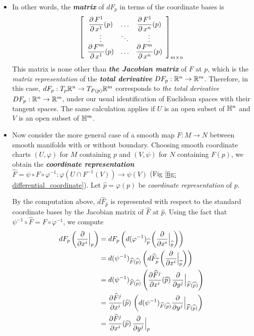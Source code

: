 \documentclass[11pt]{article}
\begin{document}
\begin{itemize}
\item In other words, the \emph{\textbf{matrix}} of $dF_p$ in terms of the coordinate bases is 
\begin{align}
\left[\begin{array}{ccc}
\dfrac{\partial\,F^{1}}{\partial\,x^{1}}(p)& \ldots& \dfrac{\partial\,F^{1}}{\partial\,x^{n}}(p)\\
\vdots & \ddots & \vdots\\
\dfrac{\partial\,F^{m}}{\partial\,x^{1}}(p)& \ldots& \dfrac{\partial\,F^{m}}{\partial\,x^{n}}(p)
\end{array}\right]_{m \times n}  \label{eqn: differential_coordinate_mat}
\end{align} This matrix is none other than \emph{\textbf{the Jacobian matrix}} of $F$ at $p$, which is the \emph{matrix representation} of the \emph{\textbf{total derivative}} $DF_{p}: {\mathbb R}^n \rightarrow {\mathbb R}^m$. 
Therefore, in this case, $dF_p: T_{p}{\mathbb R}^n \rightarrow T_{F(p)}{\mathbb R}^m$ corresponds to \emph{the total derivative} $DF_{p}: {\mathbb R}^n \rightarrow {\mathbb R}^m$, under our usual identification of Euclidean spaces with their tangent spaces. The same calculation applies if $U$ is an open subset of ${\mathbb H}^n$ and $V$ is an open subset of ${\mathbb H}^m$.

\item Now consider the more general case of a smooth map $F: M \rightarrow N$ between smooth manifolds with or without boundary.   Choosing smooth coordinate charts $(U,\varphi)$ for $M$ containing $p$ and $(V, \psi)$  for $N$ containing $F(p)$, we obtain the \emph{\textbf{coordinate representation}} $\widehat{F} = \psi \circ F \circ \varphi^{-1}: \varphi(U \cap F^{-1}(V)) \rightarrow \psi(V)$ (Fig \ref{fig: differential_coordinate}). Let $\widehat{p} = \varphi(p)$ be \emph{coordinate representation} of $p$.

By the computation above, $d\widehat{F}_{\widehat{p}}$ is represented with respect to the standard coordinate bases by the Jacobian matrix of $\widehat{F}$ at $\widehat{p}$. Using the fact that $\psi^{-1} \circ \widehat{F} =  F \circ \varphi^{-1}$, we compute
\begin{align*}
dF_{p}\left(\frac{\partial }{ \partial x^{i}}\Bigr|_{p}\right) &= dF_{p}\left(d (\varphi^{-1})_{\widehat{p}}\left(\frac{\partial }{ \partial x^{i}}\Bigr|_{\widehat{p}}\right)\right) \\
&= d(\psi^{-1})_{\widehat{F}(\widehat{p})}\left(d\widehat{F}_{\widehat{p}}\left(\frac{\partial }{ \partial x^{i}}\Bigr|_{\widehat{p}}\right) \right)\\
&= d(\psi^{-1})_{\widehat{F}(\widehat{p})}\left( \frac{\partial \widehat{F}^{j}}{ \partial x^{i}}(\widehat{p})\,\frac{\partial }{ \partial y^{j}}\Bigr|_{\widehat{F}(\widehat{p})} \right)\\
&= \frac{\partial \widehat{F}^{j}}{ \partial x^{i}}(\widehat{p})\,\left(d(\psi^{-1})_{\widehat{F}(\widehat{p})}\frac{\partial }{ \partial y^{j}}\Bigr|_{\widehat{F}(\widehat{p})}\right)\\
&= \frac{\partial \widehat{F}^{j}}{ \partial x^{i}}(\widehat{p})\,\frac{\partial }{ \partial y^{j}}\Bigr|_{p}
\end{align*}


\end{itemize}
\end{document}
